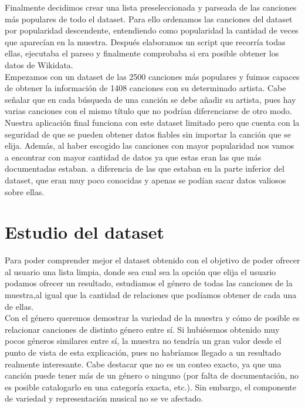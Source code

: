 Finalmente decidimos crear una lista preseleccionada y parseada de las canciones más populares de todo el dataset. Para ello ordenamos las canciones del dataset por popularidad descendente, entendiendo como popularidad la cantidad de veces que aparecían en la muestra. Después elaboramos un script que recorría todas ellas, ejecutaba el parseo y finalmente comprobaba si era posible obtener los datos de Wikidata.\\

Empezamos con un dataset de las 2500 canciones más populares y fuimos capaces de obtener la información de 1408 canciones con su determinado artista. Cabe señalar que en cada búsqueda de una canción se debe añadir su artista, pues hay varias canciones con el mismo título que no podrían diferenciarse de otro modo.\\

Nuestra aplicación final funciona con este dataset limitado pero que cuenta con la seguridad de que se pueden obtener datos fiables sin importar la canción que se elija. Además, al haber escogido las canciones con mayor popularidad nos vamos a encontrar con mayor cantidad de datos ya que estas eran las que más documentadas estaban. a diferencia de las que estaban en la parte inferior del dataset, que eran muy poco conocidas y apenas se podían sacar datos valiosos sobre ellas.

\section{Estudio del dataset}

Para poder comprender mejor el dataset obtenido con el objetivo de poder ofrecer al usuario una lista limpia, donde sea cual sea la opción que elija el usuario podamos ofrecer un resultado, estudiamos el género de todas las canciones de la muestra,al igual que la cantidad de relaciones que podíamos obtener de cada una de ellas.\\

Con el género queremos demostrar la variedad de la muestra y cómo de posible es relacionar canciones de distinto género entre sí. Si hubiésemos obtenido muy pocos géneros similares entre sí, la muestra no tendría un gran valor desde el punto de vista de esta explicación, pues no habríamos llegado a un resultado realmente interesante. Cabe destacar que no es un conteo exacto, ya que una canción puede tener más de un género o ninguno (por falta de documentación, no es posible catalogarlo en una categoría exacta, etc.). Sin embargo, el componente de variedad y representación musical no se ve afectado.

